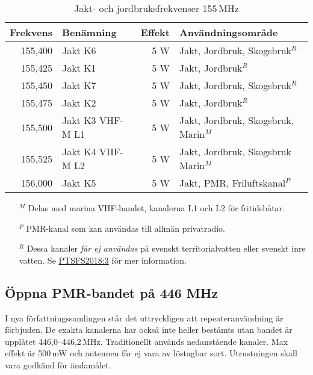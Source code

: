 \begin{table}[H]
\centering
\begin{tabular}{rlrl}
	\textbf{Frekvens} & \textbf{Benämning} & \textbf{Effekt} & \textbf{Användningsområde}           \\ \hline
	          155,400 & Jakt K6            &             5 W & Jakt, Jordbruk, Skogsbruk$^R$        \\
	          155,425 & Jakt K1            &             5 W & Jakt, Jordbruk$^R$                   \\
	          155,450 & Jakt K7            &             5 W & Jakt, Jordbruk, Skogsbruk$^R$        \\
	          155,475 & Jakt K2            &             5 W & Jakt, Jordbruk$^R$                   \\
	          155,500 & Jakt K3 VHF-M L1   &             5 W & Jakt, Jordbruk, Skogsbruk, Marin$^M$ \\
	          155,525 & Jakt K4 VHF-M L2   &             5 W & Jakt, Jordbruk, Skogsbruk Marin$^M$  \\
	          156,000 & Jakt K5            &             5 W & Jakt, PMR, Friluftskanal$^P$
\end{tabular}
\caption{Jakt- och jordbruksfrekvenser 155\,MHz}
\end{table}

\footnotesize
\begin{itemize}
	\item[$^M$] Delas med marina VHF-bandet, kanalerna L1 och L2 för fritidsbåtar.
	\item[$^P$] PMR-kanal som kan användas till allmän privatradio.
	\item[$^R$] Dessa kanaler \textit{får ej användas} på svenskt
          territorialvatten eller svenskt inre vatten. Se
          \href{https://pts.se/globalassets/startpage/dokument/legala-dokument/foreskrifter/radio/beslutade_ptsfs-2018-3-undantagsforeskrifter.pdf}{PTSFS2018:3}
          för mer information.
\end{itemize}
\normalsize

\subsection{Öppna PMR-bandet på 446 MHz}
\label{446-MHz}
I nya författningssamlingen står det uttryckligen att
repeateranvändning är förbjuden. De exakta kanalerna har också inte
heller bestämts utan bandet är upplåtet
446,0--446,2\,MHz. Traditionellt används nedanstående kanaler. Max
effekt är 500\,mW och antennen får ej vara av löstagbar
sort. Utrustningen skall vara godkänd för ändamålet.

